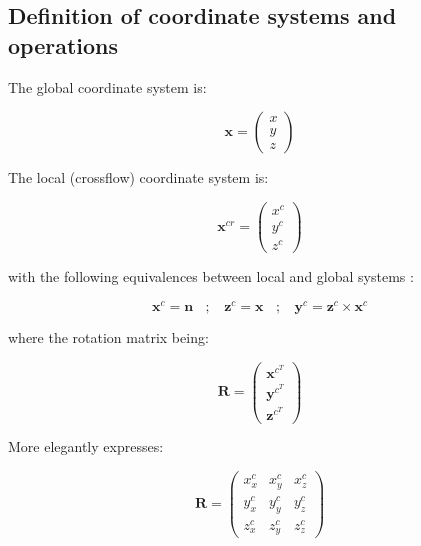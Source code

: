 \subsection{Definition of coordinate systems and operations}

The global coordinate system is:

\begin{equation}
\boldsymbol{x} =  \begin{pmatrix} x \\ y \\ z \end{pmatrix}
\end{equation}

The local (crossflow) coordinate system is:

\begin{equation}
\boldsymbol{x}^{cr} = \begin{pmatrix} x^c \\ y^c \\ z^c \end{pmatrix}
\end{equation}

with the following equivalences between local and global systems :

\begin{equation}
\boldsymbol{x}^c = \boldsymbol{n}  ~~~~ ; ~~~~ \boldsymbol{z}^c = \boldsymbol{x}  ~~~~ ; ~~~~ \boldsymbol{y}^c =  \boldsymbol{z}^c \times \boldsymbol{x}^c
\end{equation}

where the rotation matrix being:

\begin{equation}
\boldsymbol{R} = \begin{pmatrix} \boldsymbol{x}^{c^T} \\ \boldsymbol{y}^{c^T} \\ \boldsymbol{z}^{c^T} \end{pmatrix}
\end{equation}

More elegantly expresses:

\begin{equation}
\boldsymbol{R} = \begin{pmatrix} x^c_x & x^c_y & x^c_z \\ y^c_x & y^c_y & y^c_z \\ z^c_x & z^c_y & z^c_z \end{pmatrix}
\end{equation}




